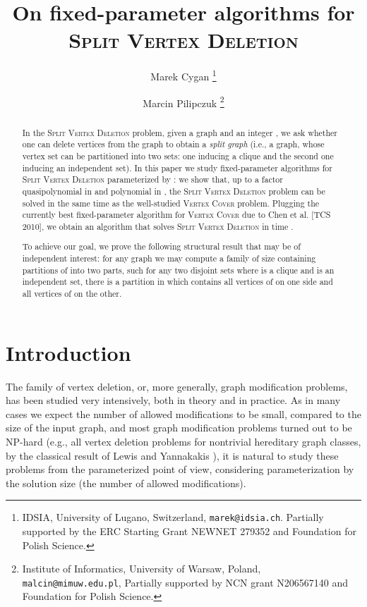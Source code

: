 \documentclass{article}
\newcommand{\splitlong}{\textsc{Split Vertex Deletion}\xspace}
\newcommand{\vertexcover}{\textsc{Vertex Cover}\xspace}
\theoremstyle{definition}
\begin{document}
  \date{}

  \author{
  Marek Cygan
  \thanks{
    IDSIA, University of Lugano, Switzerland, \texttt{marek@idsia.ch}.
    Partially supported by the ERC Starting Grant NEWNET 279352 and Foundation for Polish Science.
  }
  \and
  Marcin Pilipczuk 
  \thanks{
    Institute of Informatics, University of Warsaw, Poland, \texttt{malcin@mimuw.edu.pl},
    Partially supported by NCN grant N206567140 and Foundation for Polish Science.
  }
  }

  \title{On fixed-parameter algorithms for \splitlong}

\maketitle

\begin{abstract}
In the \splitlong problem, given a graph  and an integer ,
we ask whether one can delete  vertices from the graph  to obtain
a {\em{split graph}} (i.e., a graph, whose vertex set can be partitioned into two sets:
    one inducing a clique and the second one inducing an independent set).
In this paper we study fixed-parameter algorithms for \splitlong parameterized by :
we show that, up to a factor quasipolynomial in  and polynomial in , the \splitlong
problem can be solved in the same time as the well-studied \vertexcover problem.
Plugging the currently best fixed-parameter algorithm for \vertexcover due to Chen et al. [TCS 2010],
we obtain an algorithm that solves \splitlong in time .

To achieve our goal, we prove the following structural result that may be of independent interest:
for any graph  we may compute a family  of size  
containing partitions of  into two parts, such
for any two disjoint sets  where  is a clique
and  is an independent set, there is a partition in  which contains
all vertices of  on one side and all vertices of  on the other.
\end{abstract}

\section{Introduction}

The family of vertex deletion, or, more generally,
graph modification problems, has been studied very intensively,
both in theory and in practice.
As in many cases we expect the number of allowed modifications to
be small, compared to the size of the input graph,
   and most graph modification problems
turned out to be NP-hard (e.g., all vertex deletion problems for nontrivial hereditary
graph classes, by the classical
result of Lewis and Yannakakis \cite{lewis-yannakakis}),
it is natural to study these problems from the parameterized point of view, considering
parameterization by the solution size (the number of allowed modifications).
\end{document}
